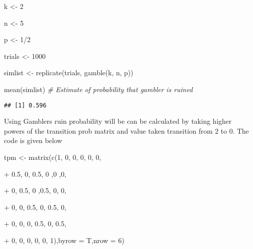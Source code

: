 \documentclass[
]{article}
\newenvironment{Shaded}{\begin{snugshade}}{\end{snugshade}}
\newcommand{\AttributeTok}[1]{\textcolor[rgb]{0.77,0.63,0.00}{#1}}
\newcommand{\CommentTok}[1]{\textcolor[rgb]{0.56,0.35,0.01}{\textit{#1}}}
\newcommand{\DecValTok}[1]{\textcolor[rgb]{0.00,0.00,0.81}{#1}}
\newcommand{\FloatTok}[1]{\textcolor[rgb]{0.00,0.00,0.81}{#1}}
\newcommand{\FunctionTok}[1]{\textcolor[rgb]{0.00,0.00,0.00}{#1}}
\newcommand{\NormalTok}[1]{#1}
\newcommand{\OtherTok}[1]{\textcolor[rgb]{0.56,0.35,0.01}{#1}}
\newcommand{\SpecialCharTok}[1]{\textcolor[rgb]{0.00,0.00,0.00}{#1}}
\begin{document}
\begin{Shaded}
\begin{Highlighting}[]
\NormalTok{k }\OtherTok{\textless{}{-}} \DecValTok{2}

\NormalTok{n }\OtherTok{\textless{}{-}} \DecValTok{5}  

\NormalTok{p }\OtherTok{\textless{}{-}} \DecValTok{1}\SpecialCharTok{/}\DecValTok{2}  

\NormalTok{trials }\OtherTok{\textless{}{-}} \DecValTok{1000}

\NormalTok{simlist }\OtherTok{\textless{}{-}} \FunctionTok{replicate}\NormalTok{(trials, }\FunctionTok{gamble}\NormalTok{(k, n, p))}

\FunctionTok{mean}\NormalTok{(simlist) }\CommentTok{\# Estimate of probability that gambler is ruined}
\end{Highlighting}
\end{Shaded}

\begin{verbatim}
## [1] 0.596
\end{verbatim}

Using Gamblers ruin probability will be can be calculated by taking
higher powers of the transition prob matrix and value taken transition
from 2 to 0. The code is given below

\begin{Shaded}
\begin{Highlighting}[]
\NormalTok{tpm }\OtherTok{\textless{}{-}} \FunctionTok{matrix}\NormalTok{(}\FunctionTok{c}\NormalTok{(}\DecValTok{1}\NormalTok{, }\DecValTok{0}\NormalTok{, }\DecValTok{0}\NormalTok{, }\DecValTok{0}\NormalTok{, }\DecValTok{0}\NormalTok{, }\DecValTok{0}\NormalTok{,}

\SpecialCharTok{+} \FloatTok{0.5}\NormalTok{, }\DecValTok{0}\NormalTok{, }\FloatTok{0.5}\NormalTok{, }\DecValTok{0}\NormalTok{ ,}\DecValTok{0}\NormalTok{ ,}\DecValTok{0}\NormalTok{,}

\SpecialCharTok{+} \DecValTok{0}\NormalTok{, }\FloatTok{0.5}\NormalTok{, }\DecValTok{0}\NormalTok{ ,}\FloatTok{0.5}\NormalTok{, }\DecValTok{0}\NormalTok{, }\DecValTok{0}\NormalTok{,}

\SpecialCharTok{+} \DecValTok{0}\NormalTok{, }\DecValTok{0}\NormalTok{, }\FloatTok{0.5}\NormalTok{, }\DecValTok{0}\NormalTok{, }\FloatTok{0.5}\NormalTok{, }\DecValTok{0}\NormalTok{,}

\SpecialCharTok{+} \DecValTok{0}\NormalTok{, }\DecValTok{0}\NormalTok{, }\DecValTok{0}\NormalTok{, }\FloatTok{0.5}\NormalTok{, }\DecValTok{0}\NormalTok{, }\FloatTok{0.5}\NormalTok{,}

\SpecialCharTok{+} \DecValTok{0}\NormalTok{, }\DecValTok{0}\NormalTok{, }\DecValTok{0}\NormalTok{, }\DecValTok{0}\NormalTok{, }\DecValTok{0}\NormalTok{, }\DecValTok{1}\NormalTok{),}\AttributeTok{byrow =}\NormalTok{ T,}\AttributeTok{nrow =} \DecValTok{6}\NormalTok{)}
\end{Highlighting}
\end{Shaded}
\end{document}
